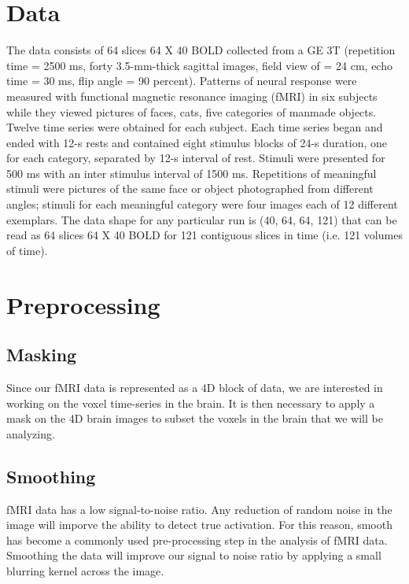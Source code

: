 \documentclass[11pt]{article}
\begin{document}
\section{Data}

The data consists of 64 slices  64 X 40 BOLD collected from a GE 3T (repetition 
time = 2500 ms, forty 3.5-mm-thick sagittal images, field view of = 24 cm, echo 
time = 30 ms, flip angle = 90 percent). Patterns of neural response were 
measured with functional magnetic resonance imaging (fMRI) in six subjects 
while they viewed pictures of faces, cats, five categories of manmade objects. 
Twelve time series were obtained for each subject. Each time series began and 
ended with 12-s rests and contained eight stimulus blocks of 24-s duration, one 
for each category, separated by 12-s interval of rest. Stimuli were presented 
for 500 ms with an inter stimulus interval of 1500 ms. Repetitions of 
meaningful stimuli were pictures of the same face or object photographed from 
different angles; stimuli for each meaningful category were four images each of 
12 different exemplars. The data shape for any particular run is (40, 64, 64, 
121) that can be read as 64 slices 64 X 40 BOLD for 121 contiguous slices in 
time (i.e. 121 volumes of time).

\section{Preprocessing}

\subsection{Masking}

Since our fMRI data is represented as a 4D block of data, we are interested in 
working on the voxel time-series in the brain. It is then necessary to apply a 
mask on the 4D brain images to subset the voxels in the brain that we will be 
analyzing.

\subsection{Smoothing}

fMRI data has a low signal-to-noise ratio. Any reduction of random noise in the 
image will imporve the ability to detect true activation.  For this reason, 
smooth has become a commonly used pre-processing step in the analysis of fMRI 
data. Smoothing the data will improve our signal to noise ratio by applying a 
small blurring kernel across the image.
\end{document}
